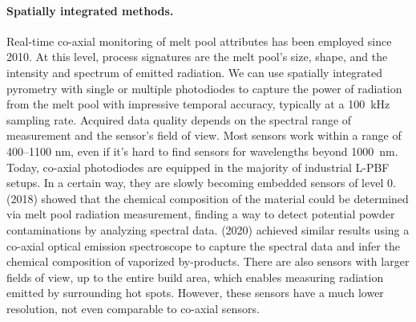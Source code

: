 \paragraph{Spatially integrated methods.} Real-time co-axial monitoring of melt pool attributes has been employed since 2010. At this level, process signatures are the melt pool's size, shape, and the intensity and spectrum of emitted radiation. We can use spatially integrated pyrometry with single or multiple photodiodes to capture the power of radiation from the melt pool with impressive temporal accuracy, typically at a \SI{100}{\kilo\hertz} sampling rate. Acquired data quality depends on the spectral range of measurement and the sensor's field of view. Most sensors work within a range of \numrange{400}{1100} \unit{\nano\metre}, even if it's hard to find sensors for wavelengths beyond \SI{1000}{\nano\metre}. Today, co-axial photodiodes are equipped in the majority of industrial L-PBF setups. In a certain way, they are slowly becoming embedded sensors of level 0. \citeauthor{montazeri_-process_2018} (2018) showed that the chemical composition of the material could be determined via melt pool radiation measurement, finding a way to detect potential powder contaminations by analyzing spectral data. \citeauthor{lough_-situ_2020} (2020) achieved similar results using a co-axial optical emission spectroscope to capture the spectral data and infer the chemical composition of vaporized by-products. There are also sensors with larger fields of view, up to the entire build area, which enables measuring radiation emitted by surrounding hot spots. However, these sensors have a much lower resolution, not even comparable to co-axial sensors.

